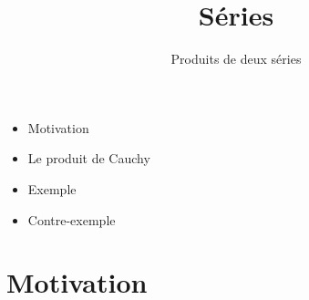 


\usepackage{mathtools}
   





\title{{\bf Séries}}
\subtitle{Produits de deux séries}

\begin{frame}
  
  \debutmontitre

  \pause

{\footnotesize
\hfill
{}
\begin{minipage}{0.6\textwidth}
  \begin{itemize}
    \item<3-> Motivation
    \item<4-> Le produit de Cauchy
    \item<5-> Exemple
    \item<6-> Contre-exemple
  \end{itemize}
\end{minipage}
}

\end{frame}

\setcounter{framenumber}{0}



\section{Motivation}

